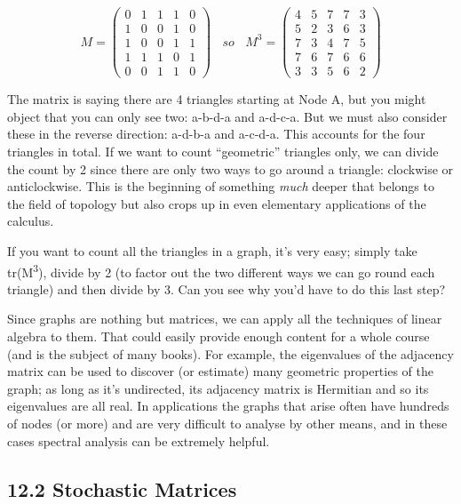 \documentclass[oneside,english]{amsbook}
\numberwithin{section}{chapter}
\theoremstyle{plain}
\theoremstyle{definition}
\begin{document}
\[M = \begin{pmatrix}
	0 & 1 & 1 & 1 & 0 \\
	1 & 0 & 0 & 1 & 0 \\
	1 & 0 & 0 & 1 & 1 \\
	1 & 1 & 1 & 0 & 1 \\
	0 & 0 & 1 & 1 & 0
\end{pmatrix}\ \ \ \ so\ \ \ \ M^{3} = \begin{pmatrix}
	4 & 5 & 7 & 7 & 3 \\
	5 & 2 & 3 & 6 & 3 \\
	7 & 3 & 4 & 7 & 5 \\
	7 & 6 & 7 & 6 & 6 \\
	3 & 3 & 5 & 6 & 2
\end{pmatrix}\]

The matrix is saying there are 4 triangles starting at Node A, but you
might object that you can only see two: a-b-d-a and a-d-c-a. But we must
also consider these in the reverse direction: a-d-b-a and a-c-d-a. This
accounts for the four triangles in total. If we want to count
``geometric'' triangles only, we can divide the count by 2 since there
are only two ways to go around a triangle: clockwise or anticlockwise.
This is the beginning of something \emph{much} deeper that belongs to
the field of topology but also crops up in even elementary applications
of the calculus.

If you want to count all the triangles in a graph, it's very easy;
simply take tr(M\textsuperscript{3}), divide by 2 (to factor out the two
different ways we can go round each triangle) and then divide by 3. Can
you see why you'd have to do this last step?

Since graphs are nothing but matrices, we can apply all the techniques
of linear algebra to them. That could easily provide enough content for
a whole course (and is the subject of many books). For example, the
eigenvalues of the adjacency matrix can be used to discover (or
estimate) many geometric properties of the graph; as long as it's
undirected, its adjacency matrix is Hermitian and so its eigenvalues are
all real. In applications the graphs that arise often have hundreds of
nodes (or more) and are very difficult to analyse by other means, and in
these cases spectral analysis can be extremely helpful.

\subsection{12.2 Stochastic Matrices}\label{stochastic-matrices}
\end{document}
